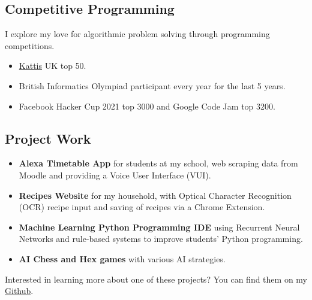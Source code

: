 \documentclass{Resume}
\begin{document}
		\subsection{Competitive Programming}
			I explore my love for algorithmic problem solving through programming competitions. 
			\begin{itemize}
			    \item \href{https://open.kattis.com/countries/GBR}{Kattis} UK top 50.
			    \item British Informatics Olympiad participant every year for the last 5 years.
			    \item Facebook Hacker Cup 2021 top 3000 and Google Code Jam top 3200.
			    
			\end{itemize}
		\subsection{Project Work}
			\begin{itemize}[itemsep=1mm, parsep=0pt]
				\item \textbf{Alexa Timetable App} for students at my school, web scraping data from Moodle and providing a Voice User Interface (VUI).
				\item \textbf{Recipes Website} for my household, with Optical Character Recognition (OCR) recipe input and saving of recipes via a Chrome Extension.
				\item \textbf{Machine Learning Python Programming IDE} using Recurrent Neural Networks and rule-based systems to improve students' Python programming. %
				\item \textbf{AI Chess and Hex games} with various AI strategies.
			\end{itemize}
			Interested in learning more about one of these projects? You can find them on my \href{https://github.com/starswap}{Github}.
\end{document}
